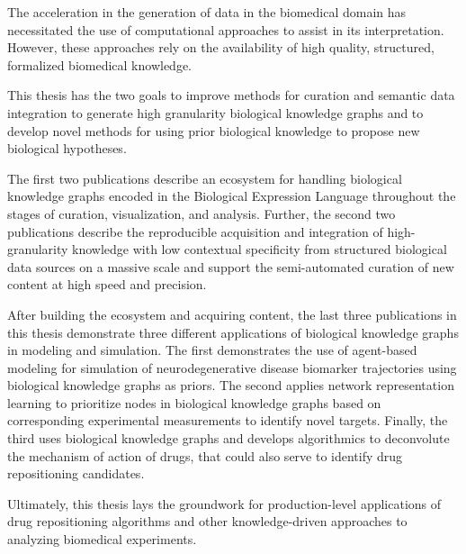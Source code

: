 The acceleration in the generation of data in the biomedical domain has necessitated the use of computational approaches to assist in its interpretation.
However, these approaches rely on the availability of high quality, structured, formalized biomedical knowledge.

This thesis has the two goals to improve methods for curation and semantic data integration to generate high granularity biological knowledge graphs and to develop novel methods for using prior biological knowledge to propose new biological hypotheses.

The first two publications describe an ecosystem for handling biological knowledge graphs encoded in the Biological Expression Language throughout the stages of curation, visualization, and analysis.
Further, the second two publications describe the reproducible acquisition and integration of high-granularity knowledge with low contextual specificity from structured biological data sources on a massive scale and support the semi-automated curation of new content at high speed and precision.

After building the ecosystem and acquiring content, the last three publications in this thesis demonstrate three different applications of biological knowledge graphs in modeling and simulation.
The first demonstrates the use of agent-based modeling for simulation of neurodegenerative disease biomarker trajectories using biological knowledge graphs as priors.
The second applies network representation learning to prioritize nodes in biological knowledge graphs based on corresponding experimental measurements to identify novel targets.
Finally, the third uses biological knowledge graphs and develops algorithmics to deconvolute the mechanism of action of drugs, that could also serve to identify drug repositioning candidates.

Ultimately, this thesis lays the groundwork for production-level applications of drug repositioning algorithms and other knowledge-driven approaches to analyzing biomedical experiments.
